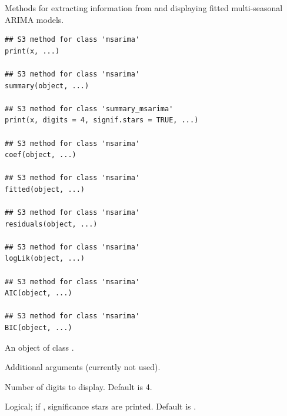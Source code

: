 \documentclass[a4paper]{book}
\begin{document}
%
\begin{Description}
Methods for extracting information from and displaying fitted multi-seasonal ARIMA models.
\end{Description}
%
\begin{Usage}
\begin{verbatim}
## S3 method for class 'msarima'
print(x, ...)

## S3 method for class 'msarima'
summary(object, ...)

## S3 method for class 'summary_msarima'
print(x, digits = 4, signif.stars = TRUE, ...)

## S3 method for class 'msarima'
coef(object, ...)

## S3 method for class 'msarima'
fitted(object, ...)

## S3 method for class 'msarima'
residuals(object, ...)

## S3 method for class 'msarima'
logLik(object, ...)

## S3 method for class 'msarima'
AIC(object, ...)

## S3 method for class 'msarima'
BIC(object, ...)
\end{verbatim}
\end{Usage}
%
\begin{Arguments}
\begin{ldescription}
\item[\code{x}, \code{object}] An object of class .

\item[\code{...}] Additional arguments (currently not used).

\item[\code{digits}] Number of digits to display. Default is 4.

\item[\code{signif.stars}] Logical; if , significance stars are printed. Default is .
\end{ldescription}
\end{Arguments}
\end{document}
